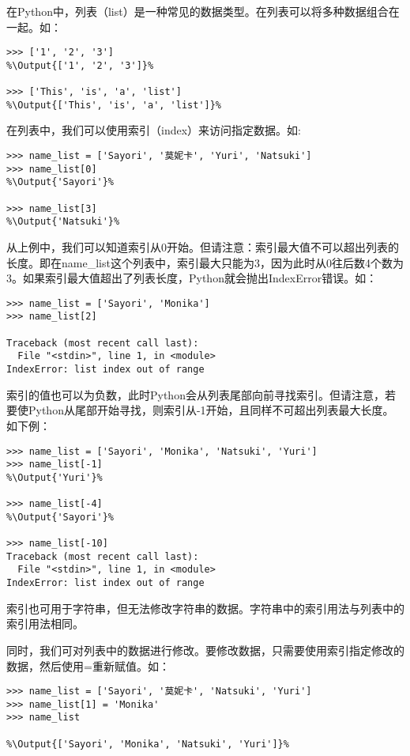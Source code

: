 在Python中，列表（list）是一种常见的数据类型。在列表可以将多种数据组合在一起。如：
\begin{lstlisting}
>>> ['1', '2', '3']
%\Output{['1', '2', '3']}%

>>> ['This', 'is', 'a', 'list']
%\Output{['This', 'is', 'a', 'list']}%

\end{lstlisting}


在列表中，我们可以使用索引（index）来访问指定数据。如:
\begin{lstlisting}
>>> name_list = ['Sayori', '莫妮卡', 'Yuri', 'Natsuki']
>>> name_list[0]
%\Output{'Sayori'}%

>>> name_list[3]
%\Output{'Natsuki'}%
\end{lstlisting}

\begin{Warning}
    从上例中，我们可以知道索引从0开始。但请注意：索引最大值不可以超出列表的长度。即在name\_list这个列表中，索引最大只能为3，因为此时从0往后数4个数为3。如果索引最大值超出了列表长度，Python就会抛出IndexError错误。如：
    \begin{lstlisting}[numbers=none]
>>> name_list = ['Sayori', 'Monika']
>>> name_list[2]

Traceback (most recent call last):
  File "<stdin>", line 1, in <module>
IndexError: list index out of range
    \end{lstlisting}
\end{Warning}

\begin{ExtraKnowledge}
    索引的值也可以为负数，此时Python会从列表尾部向前寻找索引。但请注意，若要使Python从尾部开始寻找，则索引从-1开始，且同样不可超出列表最大长度。如下例：
    \begin{lstlisting}[numbers=none]
>>> name_list = ['Sayori', 'Monika', 'Natsuki', 'Yuri']
>>> name_list[-1]
%\Output{'Yuri'}%

>>> name_list[-4]
%\Output{'Sayori'}%

>>> name_list[-10]
Traceback (most recent call last):
  File "<stdin>", line 1, in <module>
IndexError: list index out of range
    \end{lstlisting}
\end{ExtraKnowledge}

\begin{ExtraKnowledge}
    索引也可用于字符串，但无法修改字符串的数据。字符串中的索引用法与列表中的索引用法相同。
\end{ExtraKnowledge}

同时，我们可对列表中的数据进行修改。要修改数据，只需要使用索引指定修改的数据，然后使用=重新赋值。如：
\begin{lstlisting}
>>> name_list = ['Sayori', '莫妮卡', 'Natsuki', 'Yuri']
>>> name_list[1] = 'Monika'
>>> name_list

%\Output{['Sayori', 'Monika', 'Natsuki', 'Yuri']}%
\end{lstlisting}

